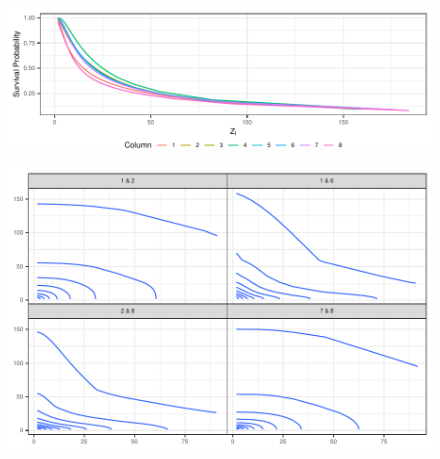 \begin{figure}[h]
  \label{fig:condsurv1d}
  \includegraphics{./images/condsurv_1d}
\end{figure}

\begin{figure}[h]
  \label{fig:condsurv_2d}
  \includegraphics{./images/condsurv_2d}
\end{figure}









